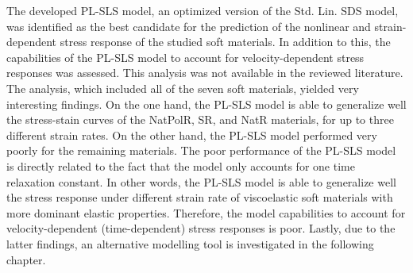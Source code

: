 The developed PL-SLS model, an optimized version of the Std. Lin. SDS model, was identified as the best candidate for the prediction of the nonlinear and strain-dependent stress response of the studied soft materials. In addition to this, the capabilities of the PL-SLS model to account for velocity-dependent stress responses was assessed. This analysis was not available in the reviewed literature. The analysis, which included all of the seven soft materials, yielded very interesting findings. On the one hand, the PL-SLS model is able to generalize well the stress-stain curves of the NatPolR, SR, and NatR materials, for up to three different strain rates. On the other hand, the PL-SLS model performed very poorly for the remaining materials. The poor performance of the PL-SLS model is directly related to the fact that the model only accounts for one time relaxation constant. In other words, the PL-SLS model is able to generalize well the stress response under different strain rate of viscoelastic soft materials with more dominant elastic properties. Therefore, the model capabilities to account for velocity-dependent (time-dependent) stress responses is poor. Lastly, due to the latter findings, an alternative modelling tool is investigated in the following chapter.